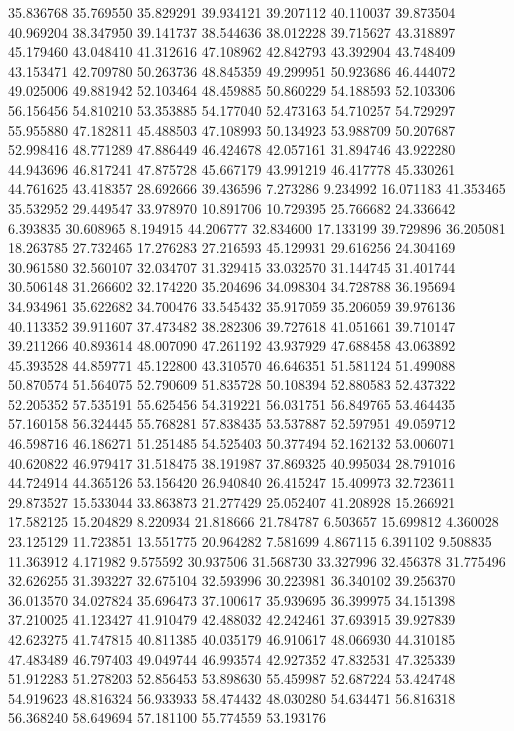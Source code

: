 35.836768
35.769550
35.829291
39.934121
39.207112
40.110037
39.873504
40.969204
38.347950
39.141737
38.544636
38.012228
39.715627
43.318897
45.179460
43.048410
41.312616
47.108962
42.842793
43.392904
43.748409
43.153471
42.709780
50.263736
48.845359
49.299951
50.923686
46.444072
49.025006
49.881942
52.103464
48.459885
50.860229
54.188593
52.103306
56.156456
54.810210
53.353885
54.177040
52.473163
54.710257
54.729297
55.955880
47.182811
45.488503
47.108993
50.134923
53.988709
50.207687
52.998416
48.771289
47.886449
46.424678
42.057161
31.894746
43.922280
44.943696
46.817241
47.875728
45.667179
43.991219
46.417778
45.330261
44.761625
43.418357
28.692666
39.436596
7.273286
9.234992
16.071183
41.353465
35.532952
29.449547
33.978970
10.891706
10.729395
25.766682
24.336642
6.393835
30.608965
8.194915
44.206777
32.834600
17.133199
39.729896
36.205081
18.263785
27.732465
17.276283
27.216593
45.129931
29.616256
24.304169
30.961580
32.560107
32.034707
31.329415
33.032570
31.144745
31.401744
30.506148
31.266602
32.174220
35.204696
34.098304
34.728788
36.195694
34.934961
35.622682
34.700476
33.545432
35.917059
35.206059
39.976136
40.113352
39.911607
37.473482
38.282306
39.727618
41.051661
39.710147
39.211266
40.893614
48.007090
47.261192
43.937929
47.688458
43.063892
45.393528
44.859771
45.122800
43.310570
46.646351
51.581124
51.499088
50.870574
51.564075
52.790609
51.835728
50.108394
52.880583
52.437322
52.205352
57.535191
55.625456
54.319221
56.031751
56.849765
53.464435
57.160158
56.324445
55.768281
57.838435
53.537887
52.597951
49.059712
46.598716
46.186271
51.251485
54.525403
50.377494
52.162132
53.006071
40.620822
46.979417
31.518475
38.191987
37.869325
40.995034
28.791016
44.724914
44.365126
53.156420
26.940840
26.415247
15.409973
32.723611
29.873527
15.533044
33.863873
21.277429
25.052407
41.208928
15.266921
17.582125
15.204829
8.220934
21.818666
21.784787
6.503657
15.699812
4.360028
23.125129
11.723851
13.551775
20.964282
7.581699
4.867115
6.391102
9.508835
11.363912
4.171982
9.575592
30.937506
31.568730
33.327996
32.456378
31.775496
32.626255
31.393227
32.675104
32.593996
30.223981
36.340102
39.256370
36.013570
34.027824
35.696473
37.100617
35.939695
36.399975
34.151398
37.210025
41.123427
41.910479
42.488032
42.242461
37.693915
39.927839
42.623275
41.747815
40.811385
40.035179
46.910617
48.066930
44.310185
47.483489
46.797403
49.049744
46.993574
42.927352
47.832531
47.325339
51.912283
51.278203
52.856453
53.898630
55.459987
52.687224
53.424748
54.919623
48.816324
56.933933
58.474432
48.030280
54.634471
56.816318
56.368240
58.649694
57.181100
55.774559
53.193176
